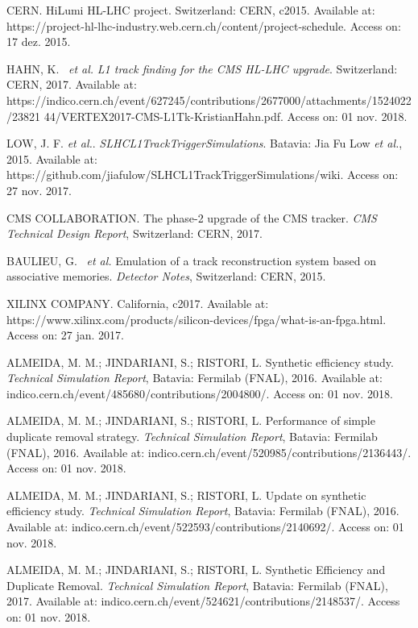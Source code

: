 \begin{thebibliography}{}
CERN. HiLumi HL-LHC project. Switzerland: CERN, c2015. Available at: https://project-hl-lhc-industry.web.cern.ch/content/project-schedule. Access on: 17 dez. 2015.

HAHN, K. ~\textit{et al.} \textit{L1 track finding for the CMS HL-LHC upgrade}. Switzerland: CERN, 2017. Available at: https://indico.cern.ch/event/627245/contributions/2677000/attachments/1524022/23821 44/VERTEX2017-CMS-L1Tk-KristianHahn.pdf. Access on: 01 nov. 2018.

LOW, J. F. \textit{et al.}. \textit{SLHCL1TrackTriggerSimulations}. Batavia: Jia Fu Low \textit{et al.}, 2015. Available at: https://github.com/jiafulow/SLHCL1TrackTriggerSimulations/wiki. Access on: 27 nov. 2017.

CMS COLLABORATION. The phase-2 upgrade of the CMS tracker. \textit{CMS Technical Design Report}, Switzerland: CERN, 2017.

BAULIEU, G. ~\textit{et al.} Emulation of a track reconstruction system based on associative memories. \textit{Detector Notes}, Switzerland: CERN, 2015.

XILINX COMPANY. California, c2017. Available at: https://www.xilinx.com/products/silicon-devices/fpga/what-is-an-fpga.html. Access on: 27 jan. 2017.

ALMEIDA, M. M.; JINDARIANI, S.; RISTORI, L. Synthetic efficiency study. \textit{Technical Simulation Report}, Batavia: Fermilab (FNAL), 2016. Available at: indico.cern.ch/event/485680/contributions/2004800/. Access on: 01 nov. 2018.

ALMEIDA, M. M.; JINDARIANI, S.; RISTORI, L. Performance of simple duplicate removal strategy. \textit{Technical Simulation Report}, Batavia: Fermilab (FNAL), 2016. Available at: indico.cern.ch/event/520985/contributions/2136443/. Access on: 01 nov. 2018.
	
ALMEIDA, M. M.; JINDARIANI, S.; RISTORI, L. Update on synthetic efficiency study. \textit{Technical Simulation Report}, Batavia: Fermilab (FNAL), 2016. Available at: indico.cern.ch/event/522593/contributions/2140692/. Access on: 01 nov. 2018.

ALMEIDA, M. M.; JINDARIANI, S.; RISTORI, L. Synthetic Efficiency and Duplicate Removal. \textit{Technical Simulation Report}, Batavia: Fermilab (FNAL), 2017. Available at: indico.cern.ch/event/524621/contributions/2148537/. Access on: 01 nov. 2018.
	

\end{thebibliography}
